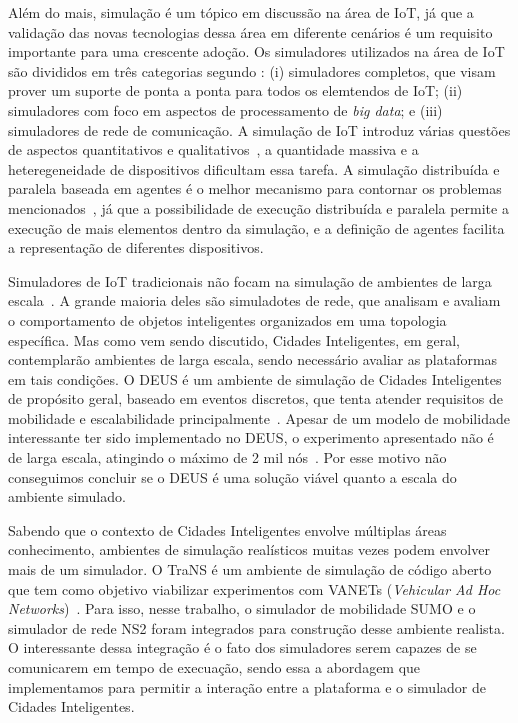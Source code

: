 Além do mais, simulação é um tópico em discussão na área de IoT, já que a validação das novas tecnologias dessa área em diferente cenários é um requisito importante para uma crescente adoção.
Os simuladores utilizados na área de IoT são divididos em três categorias segundo \cite{baig_2018}:
(i) simuladores completos, que visam prover um suporte de ponta a ponta para todos os elemtendos de IoT;
(ii) simuladores com foco em aspectos de processamento de \textit{big data};
e (iii) simuladores de rede de comunicação.
A simulação de IoT introduz várias questões de aspectos quantitativos e qualitativos~\cite{angelo_2016}, a quantidade massiva e a heteregeneidade de dispositivos dificultam essa tarefa.
A simulação distribuída e paralela baseada em agentes é o melhor mecanismo para contornar os problemas mencionados~\cite{angelo_2016}, já que a possibilidade de execução distribuída e paralela permite
a execução de mais elementos dentro da simulação, e a definição de agentes facilita a representação de diferentes dispositivos.

Simuladores de IoT tradicionais não focam na simulação de ambientes de larga escala~\cite{brambilla_2014}.
A grande maioria deles são simuladotes de rede, que analisam e avaliam o comportamento de objetos inteligentes organizados em uma topologia específica.
Mas como vem sendo discutido, Cidades Inteligentes, em geral, contemplarão ambientes de larga escala, sendo necessário avaliar as plataformas em tais condições.
O DEUS é um ambiente de simulação de Cidades Inteligentes de propósito geral, baseado em eventos discretos, que tenta atender requisitos de mobilidade e escalabilidade principalmente~\cite{picone_2012}.
Apesar de um modelo de mobilidade interessante ter sido implementado no DEUS, o experimento apresentado não é de larga escala, atingindo o máximo de 2 mil nós~\cite{picone_2012}.
Por esse motivo não conseguimos concluir se o DEUS é uma solução viável quanto a escala do ambiente simulado.

Sabendo que o contexto de Cidades Inteligentes envolve múltiplas áreas conhecimento, ambientes de simulação realísticos muitas vezes podem envolver mais de um simulador.
O TraNS é um ambiente de simulação de código aberto que tem como objetivo viabilizar experimentos com VANETs (\textit{Vehicular Ad Hoc Networks})~\cite{piorkowski_2008}.
Para isso, nesse trabalho, o simulador de mobilidade SUMO e o simulador de rede NS2 foram integrados para construção desse ambiente realista.
O interessante dessa integração é o fato dos simuladores serem capazes de se comunicarem em tempo de execuação, sendo essa a abordagem que implementamos para permitir a interação entre a plataforma
e o simulador de Cidades Inteligentes.

